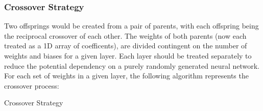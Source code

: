 \documentclass[12pt,a4paper]{article}
\makeatletter
\def\BState{\State\hskip-\ALG@thistlm}
\makeatother
\begin{document}
\subsubsection{Crossover Strategy}

    Two offsprings would be created from a pair of parents, with each offspring being the reciprocal crossover of each other. The weights of both parents (now each treated as a 1D array of coefficents), are divided contingent on the number of weights and biases for a given layer. Each layer should be treated separately to reduce the potential dependency on a purely randomly generated neural network. For each set of weights in a given layer, the following algorithm represents the crossover process:

        

    \begin{algorithm}
        \caption{Crossover Strategy}
    \end{algorithm}
\end{document}
